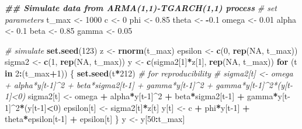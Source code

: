\documentclass[
]{book}
\newenvironment{Shaded}{\begin{snugshade}}{\end{snugshade}}
\newcommand{\CommentTok}[1]{\textcolor[rgb]{0.56,0.35,0.01}{\textit{#1}}}
\newcommand{\ConstantTok}[1]{\textcolor[rgb]{0.56,0.35,0.01}{#1}}
\newcommand{\ControlFlowTok}[1]{\textcolor[rgb]{0.13,0.29,0.53}{\textbf{#1}}}
\newcommand{\DecValTok}[1]{\textcolor[rgb]{0.00,0.00,0.81}{#1}}
\newcommand{\DocumentationTok}[1]{\textcolor[rgb]{0.56,0.35,0.01}{\textbf{\textit{#1}}}}
\newcommand{\FloatTok}[1]{\textcolor[rgb]{0.00,0.00,0.81}{#1}}
\newcommand{\FunctionTok}[1]{\textcolor[rgb]{0.13,0.29,0.53}{\textbf{#1}}}
\newcommand{\NormalTok}[1]{#1}
\newcommand{\OtherTok}[1]{\textcolor[rgb]{0.56,0.35,0.01}{#1}}
\newcommand{\SpecialCharTok}[1]{\textcolor[rgb]{0.81,0.36,0.00}{\textbf{#1}}}
\begin{document}
\begin{Shaded}
\begin{Highlighting}[]
\DocumentationTok{\#\# Simulate data from ARMA(1,1){-}TGARCH(1,1) process}
\CommentTok{\# set parameters}
\NormalTok{t\_max }\OtherTok{\textless{}{-}} \DecValTok{1000}
\NormalTok{c     }\OtherTok{\textless{}{-}} \DecValTok{0}
\NormalTok{phi   }\OtherTok{\textless{}{-}} \FloatTok{0.85}
\NormalTok{theta }\OtherTok{\textless{}{-}} \SpecialCharTok{{-}}\FloatTok{0.1}
\NormalTok{omega }\OtherTok{\textless{}{-}} \FloatTok{0.01}
\NormalTok{alpha }\OtherTok{\textless{}{-}} \FloatTok{0.1}
\NormalTok{beta  }\OtherTok{\textless{}{-}} \FloatTok{0.85}
\NormalTok{gamma }\OtherTok{\textless{}{-}} \FloatTok{0.05}

\CommentTok{\# simulate}
\FunctionTok{set.seed}\NormalTok{(}\DecValTok{123}\NormalTok{)}
\NormalTok{z }\OtherTok{\textless{}{-}} \FunctionTok{rnorm}\NormalTok{(t\_max)}
\NormalTok{epsilon }\OtherTok{\textless{}{-}} \FunctionTok{c}\NormalTok{(}\DecValTok{0}\NormalTok{, }\FunctionTok{rep}\NormalTok{(}\ConstantTok{NA}\NormalTok{, t\_max))}
\NormalTok{sigma2 }\OtherTok{\textless{}{-}} \FunctionTok{c}\NormalTok{(}\DecValTok{1}\NormalTok{, }\FunctionTok{rep}\NormalTok{(}\ConstantTok{NA}\NormalTok{, t\_max))}
\NormalTok{y     }\OtherTok{\textless{}{-}} \FunctionTok{c}\NormalTok{(sigma2[}\DecValTok{1}\NormalTok{]}\SpecialCharTok{*}\NormalTok{z[}\DecValTok{1}\NormalTok{], }\FunctionTok{rep}\NormalTok{(}\ConstantTok{NA}\NormalTok{, t\_max))}
\ControlFlowTok{for}\NormalTok{ (t }\ControlFlowTok{in} \DecValTok{2}\SpecialCharTok{:}\NormalTok{(t\_max}\SpecialCharTok{+}\DecValTok{1}\NormalTok{)) \{}
  \FunctionTok{set.seed}\NormalTok{(t}\SpecialCharTok{*}\DecValTok{212}\NormalTok{) }\CommentTok{\# for reproducibility}
  \CommentTok{\# sigma2[t]  \textless{}{-} omega + alpha*y[t{-}1]\^{}2 + beta*sigma2[t{-}1] + gamma*y[t{-}1]\^{}2 + gamma*y[t{-}1]\^{}2*(y[t{-}1]\textless{}0)}
\NormalTok{  sigma2[t]  }\OtherTok{\textless{}{-}}\NormalTok{ omega }\SpecialCharTok{+}\NormalTok{ alpha}\SpecialCharTok{*}\NormalTok{y[t}\DecValTok{{-}1}\NormalTok{]}\SpecialCharTok{\^{}}\DecValTok{2} \SpecialCharTok{+}\NormalTok{ beta}\SpecialCharTok{*}\NormalTok{sigma2[t}\DecValTok{{-}1}\NormalTok{] }\SpecialCharTok{+}\NormalTok{ gamma}\SpecialCharTok{*}\NormalTok{y[t}\DecValTok{{-}1}\NormalTok{]}\SpecialCharTok{\^{}}\DecValTok{2}\SpecialCharTok{*}\NormalTok{(y[t}\DecValTok{{-}1}\NormalTok{]}\SpecialCharTok{\textless{}}\DecValTok{0}\NormalTok{)}
\NormalTok{  epsilon[t] }\OtherTok{\textless{}{-}}\NormalTok{ sigma2[t]}\SpecialCharTok{*}\NormalTok{z[t]}
\NormalTok{  y[t]       }\OtherTok{\textless{}{-}}\NormalTok{ c }\SpecialCharTok{+}\NormalTok{ phi}\SpecialCharTok{*}\NormalTok{y[t}\DecValTok{{-}1}\NormalTok{] }\SpecialCharTok{+}\NormalTok{ theta}\SpecialCharTok{*}\NormalTok{epsilon[t}\DecValTok{{-}1}\NormalTok{] }\SpecialCharTok{+}\NormalTok{ epsilon[t]}
\NormalTok{\}}
\NormalTok{y }\OtherTok{\textless{}{-}}\NormalTok{ y[}\DecValTok{50}\SpecialCharTok{:}\NormalTok{t\_max]}
\end{Highlighting}
\end{Shaded}
\end{document}
